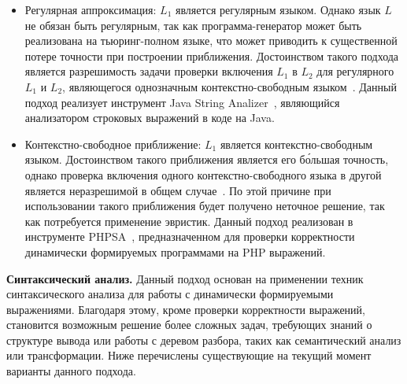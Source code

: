 \begin{itemize}
    \item Регулярная аппроксимация: $L_1$ является регулярным языком. Однако язык $L$ не обязан быть регулярным, так как программа-генератор может быть реализована на тьюринг-полном языке, что может приводить к существенной потере точности при построении приближения. Достоинством такого подхода является разрешимость задачи проверки включения $L_1$ в $L_2$ для регулярного $L_1$ и $L_2$, являющегося однозначным контекстно-свободным языком~\cite{LangIncusion}. Данный подход реализует инструмент Java String Analizer~\cite{JSA}, являющийся анализатором строковых выражений в коде на Java.

    \item Контекстно-свободное приближение: $L_1$ является контекстно-свободным языком.  Достоинством такого приближения является его б\'{о}льшая точность, однако проверка включения одного контекстно-свободного языка в другой является неразрешимой в общем случае~\cite{LangIncusion}. По  этой причине при использовании такого приближения будет получено неточное решение, так как потребуется применение эвристик. Данный подход реализован в инструменте PHPSA~\cite{PHPSA}, предназначенном для проверки корректности динамически формируемых программами на PHP выражений.

\end{itemize}

\textbf{Синтаксический анализ.} Данный подход основан на применении техник синтаксического анализа для работы с динамически формируемыми выражениями. Благодаря этому, кроме проверки корректности выражений, становится возможным решение более сложных задач, требующих знаний о структуре вывода или работы с деревом разбора, таких как семантический анализ или трансформации. Ниже перечислены существующие на текущий момент варианты данного подхода.

